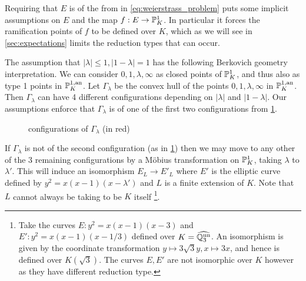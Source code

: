 Requiring that $E$ is of the from in \eqref{eq:weierstrass_problem} puts some implicit assumptions on $E$ and the map $f: E \to \mathbb{P}^{1}_K$.
In particular it forces the ramification points of $f$ to be defined over $K$, which as we will see in \cref{sec:expectations} limits the reduction types that can occur. 

The assumption that $|\lambda| \le 1, |1 - \lambda| = 1$ has the following Berkovich geometry interpretation.
We can consider $0, 1, \lambda, \infty$ as closed points of $\mathbb{P}^{1}_K$, and thus also as type 1 points in $\mathbb{P}^{1, \text{an}}_K$.
Let  $\Gamma_\lambda$ be the convex hull of the points $0, 1, \lambda, \infty$ in $\mathbb{P}^{1, \text{an}}_K$. 
Then  $\Gamma_\lambda$ can have 4 different configurations depending on $|\lambda|$ and $|1-\lambda|$. 
Our assumptions enforce that $\Gamma_\lambda$ is of one of the first two configurations from \cref{fig:configurations_of_gamma_lambda}.
\begin{figure}[ht]
    \centering
    \caption{configurations of $\Gamma_\lambda$ (in red)}
    \label{fig:configurations_of_gamma_lambda}
\end{figure}
If  $\Gamma_\lambda$ is not of the second configuration (as in \cref{fig:configurations_of_gamma_lambda}) then we may move to any other of the 3 remaining configurations by a Möbius transformation on $\mathbb{P}^{1}_K$, taking $\lambda$ to $\lambda'$. 
This will induce an isomorphism $E_L \to E'_L$ where $E'$ is the elliptic curve defined by $y^2 = x(x-1)(x-\lambda')$ and $L$ is a finite extension of $K$. 
Note  that $L$ cannot always be taking to be $K$ itself
\footnote{Take the curves $E: y^2 = x(x -1)(x-3)$ and $E': y^2 = x(x-1)(x-1 /3)$ defined over $K = \widehat{\mathbb{Q}_3^{\text{un}}}$.
An isomorphism is given by the coordinate transformation $y\mapsto 3\sqrt{3} y, x\mapsto 3x$, and hence is defined over $K(\sqrt{3} )$. The curves $E, E'$ are not isomorphic over $K$ however as they have different reduction type.}.













